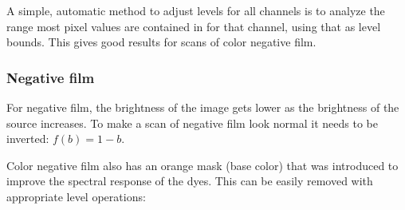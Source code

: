 \documentclass{article}
\begin{document}
A simple, automatic method to adjust levels for all channels is to analyze the range
most pixel values are contained in for that channel, using that as level bounds.
This gives good results for scans of color negative film.

\subsubsection{Negative film}

For negative film, the brightness of the image gets lower as the brightness of the
source increases. To make a scan of negative film look normal it needs to be inverted:
$f(b) = 1 - b$.

Color negative film also has an orange mask (base color) that was introduced to improve
the spectral response of the dyes. This can be easily removed with appropriate
level operations:
\end{document}
